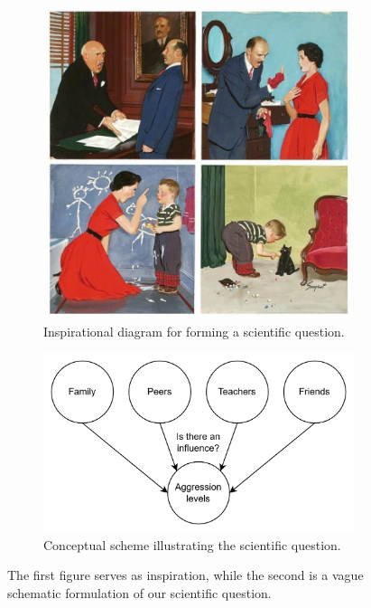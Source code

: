 \documentclass[a4paper]{article}
\begin{document}
\begin{figure}[h]
    \centering
    \begin{subfigure}[t]{0.48\textwidth}
        \centering
        \includegraphics[width=\textwidth]{Report/pics/cycle of abuse.png}
        \caption{Inspirational diagram for forming a scientific question.}
        \label{fig:cycle-of-abuse}
    \end{subfigure}
    \hfill
    \begin{subfigure}[t]{0.48\textwidth}
        \centering
        \includegraphics[width=\textwidth]{Report/pics/scheme for scientific question.png}
        \caption{Conceptual scheme illustrating the scientific question.}
        \label{fig:scientific-question}
    \end{subfigure}
    \caption{The first figure serves as inspiration, while the second is a vague schematic formulation of our scientific question.}
    \label{fig:question-figures}
\end{figure}
\end{document}
